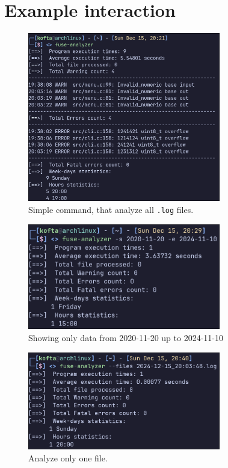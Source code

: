 \documentclass[a4paper,12pt]{article}
\begin{document}
\section{Example interaction}

\begin{figure}[h]
	\centering
	\includegraphics[width=0.75\textwidth]{assets/fuse-analyzer-default.png}
	\caption{Simple command, that analyze all \texttt{.log} files.}
\end{figure}

\newpage


\begin{figure}[h]
	\centering
	\includegraphics[width=0.75\textwidth]{assets/fuse-analyzer-data.png}
	\caption{Showing only data from 2020-11-20 up to 2024-11-10}
\end{figure}


\begin{figure}[h]
	\centering
	\includegraphics[width=0.75\textwidth]{assets/fuse-analyzer-files.png}
	\caption{Analyze only one file.}
\end{figure}
\end{document}
